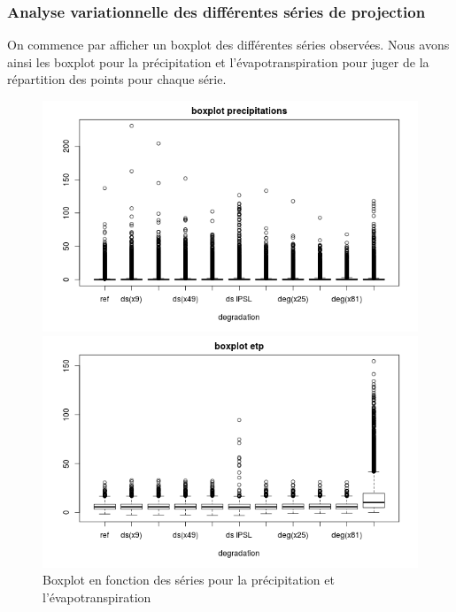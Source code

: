 \documentclass[a4paper,11pt]{article}
\numberwithin{equation}{section}
\begin{document}
\subsubsection{Analyse variationnelle des différentes séries de projection}
\label{ch:analyse variationnelle}
On commence par afficher un boxplot des différentes séries observées. Nous avons ainsi les boxplot pour la précipitation et l'évapotranspiration pour juger de la répartition des points pour chaque série.

\begin{figure}[H]
	\begin{minipage}[b]{0.48\linewidth}
		\centering \includegraphics[scale=0.4]{images/boxplot_precip.png}
	\end{minipage}\hfill
	\begin{minipage}[b]{0.48\linewidth}	
		\centering \includegraphics[scale=0.4]{images/boxplot_evap.png}
	\end{minipage}
	\caption{Boxplot en fonction des séries pour la précipitation et l'évapotranspiration}
\end{figure} 
\end{document}
